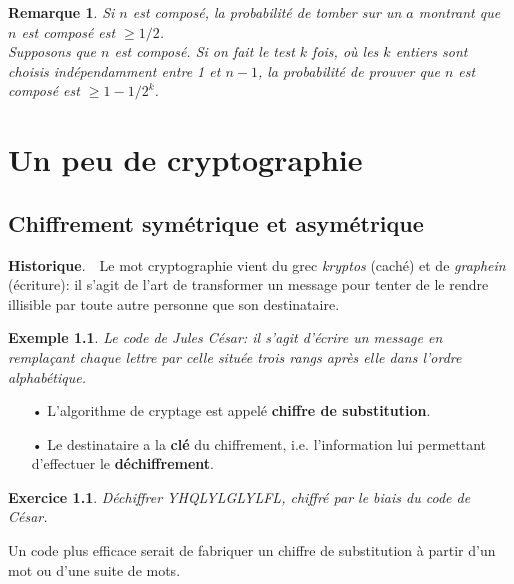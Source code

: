 \documentclass[12pt]{report}
\newtheorem*{ex}{Exemple}
\newtheorem*{exo}{Exercice}
\newtheorem*{rem}{Remarque}
\begin{document}
\begin{rem}
Si $n$ est composé, la probabilité de tomber sur un $a$ montrant que $n$ est composé est  $\geq 1/2$. \\
Supposons que $n$ est composé. Si on fait le test $k$ fois, où les $k$ entiers sont choisis indépendamment entre 1 et $n-1$, la probabilité de prouver que $n$ est composé est $\geq 1-1/2^k$.
\end{rem}


\chapter{Un peu de cryptographie}


\section{Chiffrement symétrique et asymétrique}


{\textbf{Historique}}.\ \ Le mot cryptographie vient du grec \textit{kryptos} (caché) et de \textit{graphein} (écriture): il s'agit de l'art de transformer un message pour tenter de le rendre illisible par toute autre personne que son destinataire.

\begin{ex}
Le code de Jules César: il s'agit d'écrire un message en remplaçant chaque lettre par celle située trois rangs après elle dans l'ordre alphabétique.
\end{ex}

\begin{itemize}
\item[•] L'algorithme de cryptage est appelé \textbf{chiffre de substitution}.
\item[•] Le destinataire a la \textbf{clé} du chiffrement, i.e. l'information lui permettant d'effectuer le \textbf{déchiffrement}.
\end{itemize}


\begin{exo}
Déchiffrer YHQLYLGLYLFL, chiffré par le biais du code de César.
\end{exo}

Un code plus efficace serait de fabriquer un chiffre de substitution à partir d'un mot ou d'une suite de mots.
\end{document}
